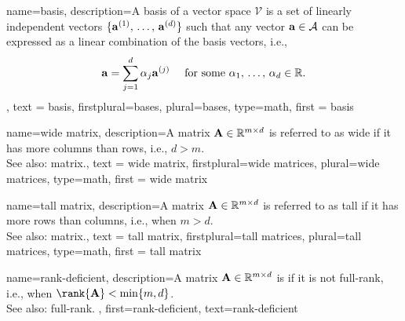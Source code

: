 {name={basis},
	description={A basis of a vector space $\mathcal{V}$ 
	is a set of linearly independent vectors $\{{\bf a}^{(1)}, \,\ldots, \,{\bf a}^{(d)}\}$ such 
	that any vector ${\bf a} \in \mathcal{A}$ can be expressed as a linear combination 
	of the basis vectors, i.e.,	
	$$ {\bf a} = \sum_{j=1}^{d} \alpha_{j} {\bf a}^{(j)} 
	\quad \text{ for some } \alpha_{1}, \,\ldots, \,\alpha_{d} \in \mathbb{R}. $$
	},
	text = {basis}, 
	firstplural={bases}, 
	plural={bases}, 
	type=math,
	first = {basis} 
}

{name={wide matrix},
 description={A matrix 
   ${\bf A} \in \mathbb{R}^{m \times d}$ 
	is referred to as wide if it has more columns than rows, i.e., $d > m$.\\ 
	See also: matrix.},
	text = {wide matrix}, 
	firstplural={wide matrices}, 
	plural={wide matrices}, 
	type=math,
   first = {wide matrix} 
}

{name={tall matrix},
 description={A matrix 
   ${\bf A} \in \mathbb{R}^{m \times d}$ 
	is referred to as tall if it has more rows than columns, i.e., when $m > d$.\\ 
	See also: matrix.},
	text = {tall matrix}, 
	firstplural={tall matrices}, 
	plural={tall matrices}, 
	type=math,
   first = {tall matrix} 
}

 {name={rank-deficient},
  description={A matrix ${\bf A} \in \mathbb{R}^{m \times d}$ 
  is if it is not full-rank, i.e., when $\rank{{\bf A}} < \min\{m,d\}$.\\ 
  See also: full-rank. 
  }, 
  first={rank-deficient}, 
  text={rank-deficient}
 }


